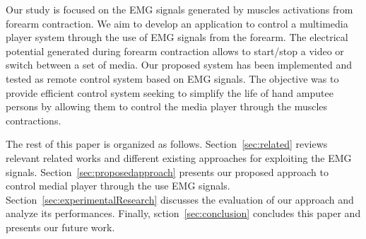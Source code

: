 \documentclass[conference]{IEEEtran}
\begin{document}
Our study is focused on the EMG signals generated by muscles activations from forearm contraction. We aim to develop an application to control a multimedia player system through the use of EMG signals from the forearm. The electrical potential generated during forearm contraction allows to start/stop a video or switch between a set of media. Our proposed system has been implemented and tested as remote control system based on EMG signals. The objective was to provide efficient control system seeking to simplify the life of hand amputee persons by allowing them to control the media player through the muscles contractions. \par
The rest of this paper is organized as follows. Section~\ref{sec:related} reviews relevant related works and different existing approaches for exploiting the EMG signals. Section~\ref{sec:proposedapproach} presents our proposed approach to control medial player through the use EMG signals. Section~\ref{sec:experimentalResearch} discusses the evaluation of our approach and analyze its performances. Finally, sction~\ref{sec:conclusion} concludes this paper and presents our future work.\par
\end{document}
